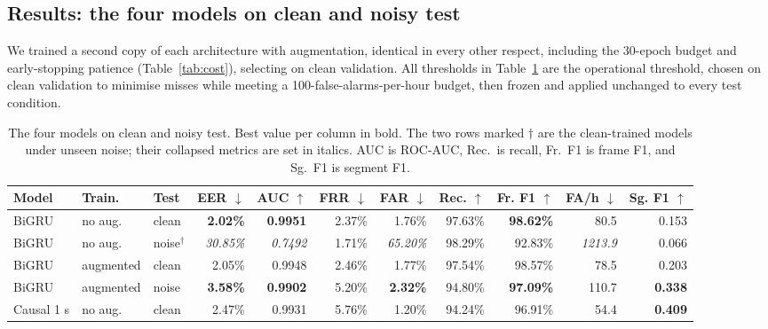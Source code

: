 \documentclass{article}
\begin{document}
\subsection{Results: the four models on clean and noisy test}

We trained a second copy of each architecture with augmentation, identical in every other respect, including the 30-epoch budget and early-stopping patience (Table~\ref{tab:cost}), selecting on clean validation. All thresholds in Table~\ref{tab:robust} are the operational threshold, chosen on clean validation to minimise misses while meeting a 100-false-alarms-per-hour budget, then frozen and applied unchanged to every test condition.

\begin{table}[H]
    \centering
    \caption{The four models on clean and noisy test. Best value per column in bold. The two rows marked $\dagger$ are the clean-trained models under unseen noise; their collapsed metrics are set in italics. AUC is ROC-AUC, Rec.\ is recall, Fr.\ F1 is frame F1, and Sg.\ F1 is segment F1.}
    \label{tab:robust}
    \setlength{\tabcolsep}{1.5pt}
    \scriptsize
    \begin{tabular}{lllrrrrrrrr}
        \toprule
        Model & Train. & Test & EER $\downarrow$ & AUC $\uparrow$ & FRR $\downarrow$ & FAR $\downarrow$ & Rec. $\uparrow$ & Fr. F1 $\uparrow$ & FA/h $\downarrow$ & Sg. F1 $\uparrow$ \\
        \midrule
        BiGRU       & no aug.   & clean & \textbf{2.02\%} & \textbf{0.9951} & 2.37\%  & 1.76\%                       & 97.63\%          & \textbf{98.62\%} & 80.5                          & 0.153 \\
        BiGRU       & no aug.   & noise$^{\dagger}$ & \textit{30.85\%} & \textit{0.7492} & 1.71\%  & \textit{65.20\%}             & 98.29\%          & 92.83\%          & \textit{1213.9}               & 0.066 \\
        BiGRU       & augmented & clean & 2.05\%          & 0.9948          & 2.46\%  & 1.77\%                       & 97.54\%          & 98.57\%          & 78.5                          & 0.203 \\
        BiGRU       & augmented & noise & \textbf{3.58\%} & \textbf{0.9902} & 5.20\%  & \textbf{2.32\%}              & 94.80\%          & \textbf{97.09\%} & 110.7                         & \textbf{0.338} \\
        Causal 1 s  & no aug.   & clean & 2.47\%          & 0.9931          & 5.76\%  & 1.20\%                       & 94.24\%          & 96.91\%          & 54.4                          & \textbf{0.409} \\

\end{tabular}
\end{table}
\end{document}
